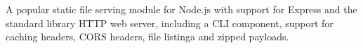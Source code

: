 A popular static file serving module for Node.js with support for Express and the
standard library HTTP web server, including a CLI component, support for caching
headers, CORS headers, file listinga and zipped payloads.
